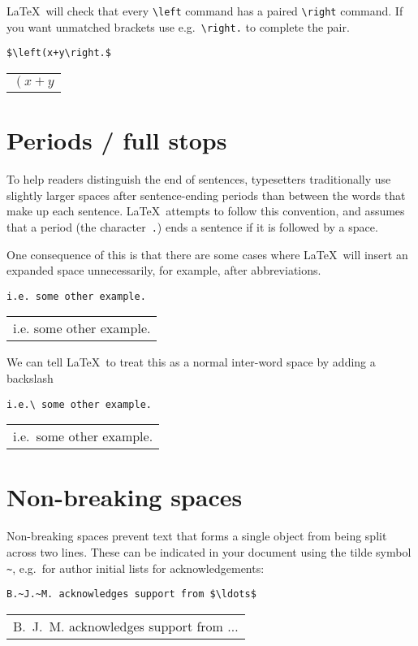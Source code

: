 \documentclass[a4paper]{tufte-handout}
\begin{document}
\LaTeX\ will check that every \lstinline{\left} command has a paired \lstinline{\right} command. If you want unmatched brackets use e.g.\ \lstinline{\right.} to complete the pair.
\begin{lstlisting}
$\left(x+y\right.$
\end{lstlisting}
\begin{tabular}{|p{10cm}}
$\left(x+y\right.$
\end{tabular} 

\section{Periods / full stops}
To help readers distinguish the end of sentences, typesetters traditionally use slightly larger spaces after sentence-ending periods than between the words that make up each sentence. \LaTeX\ attempts to follow this convention, and assumes that a period (the character~\lstinline{.}) ends a sentence if it is followed by a space.

One consequence of this is that there are some cases where \LaTeX\ will insert an expanded space unnecessarily, for example, after abbreviations.
\begin{lstlisting}
i.e. some other example.
\end{lstlisting}
\begin{tabular}{|p{10cm}}
i.e. some other example.
\end{tabular}

We can tell \LaTeX\ to treat this as a normal inter-word space by adding a backslash
\begin{lstlisting}
i.e.\ some other example.
\end{lstlisting}
\begin{tabular}{|p{10cm}}
i.e.\ some other example.
\end{tabular}

\section{Non-breaking spaces}
Non-breaking spaces prevent text that forms a single object from being split across two lines. These can be indicated in your document using the tilde symbol \lstinline{~}, e.g.\ for author initial lists for acknowledgements:
\begin{lstlisting}
B.~J.~M. acknowledges support from $\ldots$
\end{lstlisting}
\begin{tabular}{|p{10cm}}
B.~J.~M. acknowledges support from $\ldots$
\end{tabular}
\end{document}
